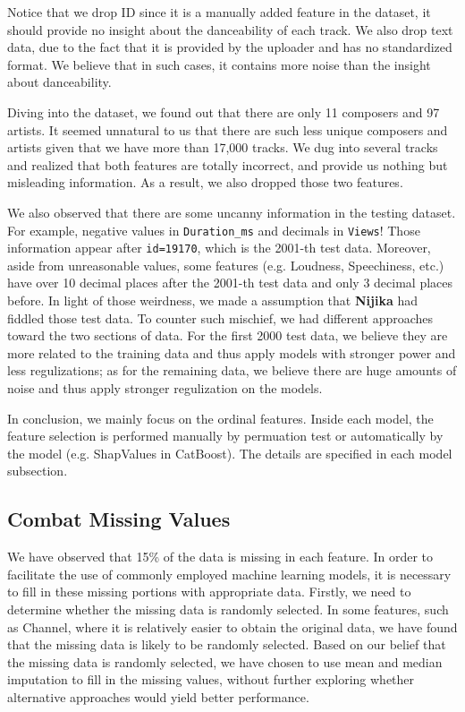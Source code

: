 \documentclass[10pt,letterpaper]{article}
\begin{document}
Notice that we drop ID since it is a manually added feature in the dataset, it should provide no insight about the danceability of each track. We also drop text data, due to the fact that it is provided by the uploader and has no standardized format. We believe that in such cases, it contains more noise than the insight about danceability. 

Diving into the dataset, we found out that there are only 11 composers and 97 artists. It seemed unnatural to us that there are such less unique composers and artists given that we have more than 17,000 tracks. We dug into several tracks and realized that both features are totally incorrect, and provide us nothing but misleading information. As a result, we also dropped those two features.

We also observed that there are some uncanny information in the testing dataset. For example, negative values in \verb|Duration_ms| and decimals in \verb|Views|! Those information appear after \verb|id=19170|, which is the 2001-th test data. Moreover, aside from unreasonable values, some features (e.g. Loudness, Speechiness, etc.) have over 10 decimal places after the 2001-th test data and only 3 decimal places before. In light of those weirdness, we made a assumption that \textbf{Nijika} had fiddled those test data. To counter such mischief, we had different approaches toward the two sections of data. For the first 2000 test data, we believe they are more related to the training data and thus apply models with stronger power and less regulizations; as for the remaining data, we believe there are huge amounts of noise and thus apply stronger regulization on the models. 

In conclusion, we mainly focus on the ordinal features. Inside each model, the feature selection is performed manually by permuation test or automatically by the model (e.g. ShapValues in CatBoost). The details are specified in each model subsection. 

\subsection{Combat Missing Values}

We have observed that 15\% of the data is missing in each feature.
In order to facilitate the use of commonly employed machine learning models, 
it is necessary to fill in these missing portions with appropriate data. 
Firstly, we need to determine whether the missing data is randomly selected. 
In some features, such as Channel, where it is relatively easier to obtain the original data, 
we have found that the missing data is likely to be randomly selected. 
Based on our belief that the missing data is randomly selected, 
we have chosen to use mean and median imputation to fill in the missing values, 
without further exploring whether alternative approaches would yield better performance.
\end{document}
